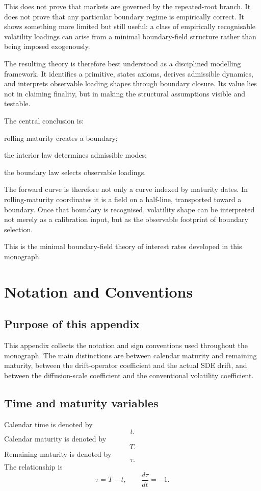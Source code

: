 \documentclass[11pt,oneside]{book}
\begin{document}
This does not prove that markets are governed by the repeated-root
branch. It does not prove that any particular boundary regime is
empirically correct. It shows something more limited but still useful: a
class of empirically recognisable volatility loadings can arise from a
minimal boundary-field structure rather than being imposed exogenously.

The resulting theory is therefore best understood as a disciplined
modelling framework. It identifies a primitive, states axioms, derives
admissible dynamics, and interprets observable loading shapes through
boundary closure. Its value lies not in claiming finality, but in making
the structural assumptions visible and testable.

The central conclusion is:

rolling maturity creates a boundary;

the interior law determines admissible modes;

the boundary law selects observable loadings.

The forward curve is therefore not only a curve indexed by maturity
dates. In rolling-maturity coordinates it is a field on a half-line,
transported toward a boundary. Once that boundary is recognised,
volatility shape can be interpreted not merely as a calibration input,
but as the observable footprint of boundary selection.

This is the minimal boundary-field theory of interest rates developed in
this monograph.


\appendix

\chapter{Notation and Conventions}\label{appendix-a}

\section{Purpose of this appendix}
This appendix collects the notation and sign conventions used throughout the monograph.  The main distinctions are between calendar maturity and remaining maturity, between the drift-operator coefficient and the actual SDE drift, and between the diffusion-scale coefficient and the conventional volatility coefficient.

\section{Time and maturity variables}
Calendar time is denoted by
\[
t.
\]
Calendar maturity is denoted by
\[
T.
\]
Remaining maturity is denoted by
\[
\tau.
\]
The relationship is
\[
\tau=T-t,
\qquad
\frac{d\tau}{dt}=-1.
\]
\end{document}
